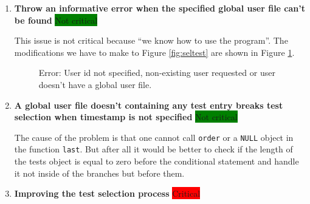 \documentclass{scrartcl}
\begin{document}
\begin{enumerate}
\item\label{iss:parseuser}\textbf{Throw an informative error when the specified global user file can't be found} \colorbox{green}{Not critical} 

This issue is not critical because ``we know how to use the program''. The modifications we have to make to Figure \ref{fig:seltest} are shown in Figure \ref{fig:modseltest}.
\begin{figure}
\begin{center}
\end{center}
\caption{Error: User id not specified, non-existing user requested or user doesn't have a global user file.}
\label{fig:modseltest}
\end{figure}
\item\label{iss:emptytests}\textbf{A global user file doesn't containing any test entry breaks test selection when timestamp is not specified} \colorbox{green}{Not critical}

The cause of the problem is that one cannot call \verb+order+ or a \verb+NULL+ object in the function \verb+last+. But after all it would be better to check if the length of the tests object is equal to zero before the conditional statement and handle it not inside of the branches but before them. 

\item\label{iss:newtestsel}\textbf{Improving the test selection process} \colorbox{red}{Critical}




\end{enumerate}
\end{document}
